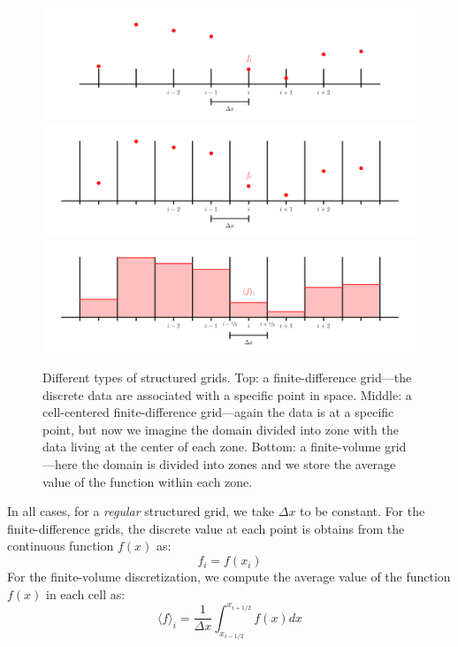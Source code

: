 \begin{figure}[t]
\centering
\includegraphics[width=\linewidth]{fd_grid} \\
\includegraphics[width=\linewidth]{ccfd_grid} \\
\includegraphics[width=\linewidth]{fv_grid}
\caption[Types of structured grids.]{\label{fig:grids} Different types of structured grids.  Top:
  a finite-difference grid---the discrete data are associated with a
  specific point in space.  Middle: a cell-centered finite-difference
  grid---again the data is at a specific point, but now we imagine the
  domain divided into zone with the data living at the center of each
  zone.  Bottom: a finite-volume grid---here the domain is divided
  into zones and we store the average value of the function within
  each zone.}
\end{figure}

In all cases, for a {\em regular} structured grid, we take $\Delta x$
to be constant.  For the finite-difference grids, the discrete value at
each point is obtains from the continuous function $f(x)$ as:
\begin{equation}
f_i = f(x_i)
\end{equation}
For the finite-volume discretization, we compute the average value of 
the function $f(x)$ in each cell as:
\begin{equation}
\langle f\rangle_i = \frac{1}{\Delta x} \int_{x_{i-1/2}}^{x_{i+1/2}} f(x) dx
\end{equation}


